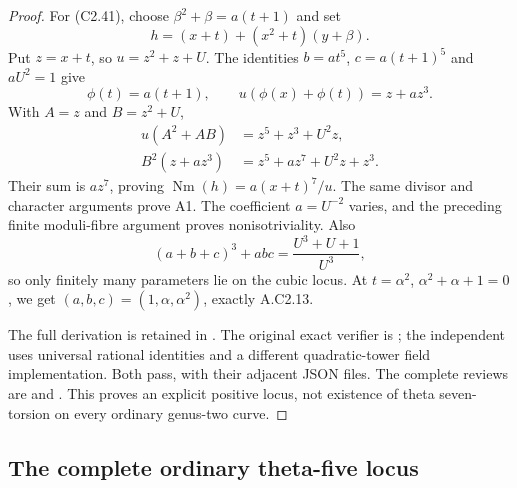 \begin{proof}
For (C2.41), choose
$\beta^2+\beta=a(t+1)$ and set
\[
                 h=(x+t)+(x^2+t)(y+\beta).
\]
Put $z=x+t$, so $u=z^2+z+U$.
The identities $b=at^5$, $c=a(t+1)^5$ and $aU^2=1$
give
\[
       \phi(t)=a(t+1),\qquad u(\phi(x)+\phi(t))=z+az^3.
\]
With $A=z$ and $B=z^2+U$,
\[
 \begin{aligned}
 u(A^2+AB)&=z^5+z^3+U^2z,\\
 B^2(z+az^3)&=z^5+az^7+U^2z+z^3 .
 \end{aligned}
\]
Their sum is $az^7$, proving
$\operatorname{Nm}(h)=a(x+t)^7/u$.
The same divisor and character arguments prove A1.
The coefficient $a=U^{-2}$ varies, and the preceding
finite moduli-fibre argument proves nonisotriviality.
Also
\[
                   (a+b+c)^3+abc=\frac{U^3+U+1}{U^3},
\]
so only finitely many parameters lie on the cubic locus.
At $t=\alpha^2$, $\alpha^2+\alpha+1=0$, we get
$(a,b,c)=(1,\alpha,\alpha^2)$, exactly A.C2.13.

The full derivation is retained in
.
The original exact verifier is
;
the independent
uses universal rational identities and a different
quadratic-tower field implementation.
Both pass, with their adjacent JSON files.
The complete reviews are
 and
.
This proves an explicit positive locus, not existence
of theta seven-torsion on every ordinary genus-two curve.
\end{proof}

\subsection{The complete ordinary theta-five locus}

